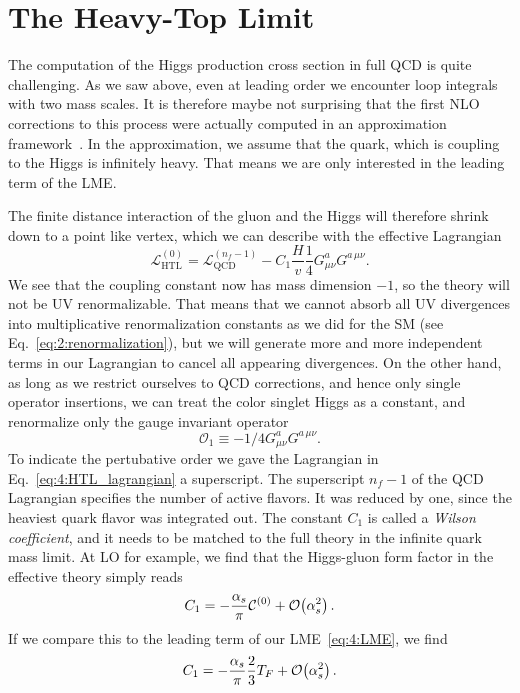 \section{The Heavy-Top Limit} \label{sec:4:HTL}
The computation of the Higgs production cross section in full \acs{QCD} is quite challenging. As we saw above, even at leading order we encounter loop integrals with two mass scales. It is therefore maybe not surprising that the first \acs{NLO} corrections to this process were actually computed in an approximation framework~\cite{Dawson:1990zj}. In the approximation, we assume that the quark, which is coupling to the Higgs is infinitely heavy. That means we are only interested in the leading term of the \acs{LME}.

The finite distance interaction of the gluon and the Higgs will therefore shrink down to a point like vertex, which we can describe with the effective Lagrangian
\begin{equation}
\mathcal{L}_{\text{HTL}}^{(0)} = \mathcal{L}_{\text{QCD}}^{(n_f - 1)} - C_1 \frac{H}{v} \frac{1}{4} G^a_{\mu \nu} G^{a\, \mu\nu}.
\label{eq:4:HTL_lagrangian}
\end{equation}
We see that the coupling constant now has mass dimension $-1$, so the theory will not be \acs{UV} renormalizable. That means that we cannot absorb all \acs{UV} divergences into multiplicative renormalization constants as we did for the \acs{SM} (see Eq.~\eqref{eq:2:renormalization}), but we will generate more and more independent terms in our Lagrangian to cancel all appearing divergences. On the other hand, as long as we restrict ourselves to \acs{QCD} corrections, and hence only single operator insertions, we can treat the color singlet Higgs as a constant, and renormalize only the gauge invariant operator
\begin{equation}
\mathcal{O}_1 \equiv - 1/4 G_{\mu\nu}^a G^{a\, \mu\nu}.
\end{equation}
To indicate the pertubative order we gave the Lagrangian in Eq.~\eqref{eq:4:HTL_lagrangian} a superscript. The superscript $n_f - 1$ of the QCD Lagrangian specifies the number of active flavors. It was reduced by one, since the heaviest quark flavor was integrated out. The constant $C_1$ is called a \textit{Wilson coefficient}, and it needs to be matched to the full theory in the infinite quark mass limit. At \acs{LO} for example, we find that the Higgs-gluon form factor in the effective theory simply reads
\begin{equation}
C_1 = - \frac{\alpha_s}{\pi} \mathcal{C}^{(0)} + \mathcal{O}\!\left(\alpha_s^2\right).
\end{equation}
If we compare this to the leading term of our \acs{LME}~\eqref{eq:4:LME}, we find
\begin{equation}
C_1 = -\frac{\alpha_s}{\pi} \frac{2}{3} T_F + \mathcal{O}\!\left(\alpha_s^2\right).
\end{equation}

